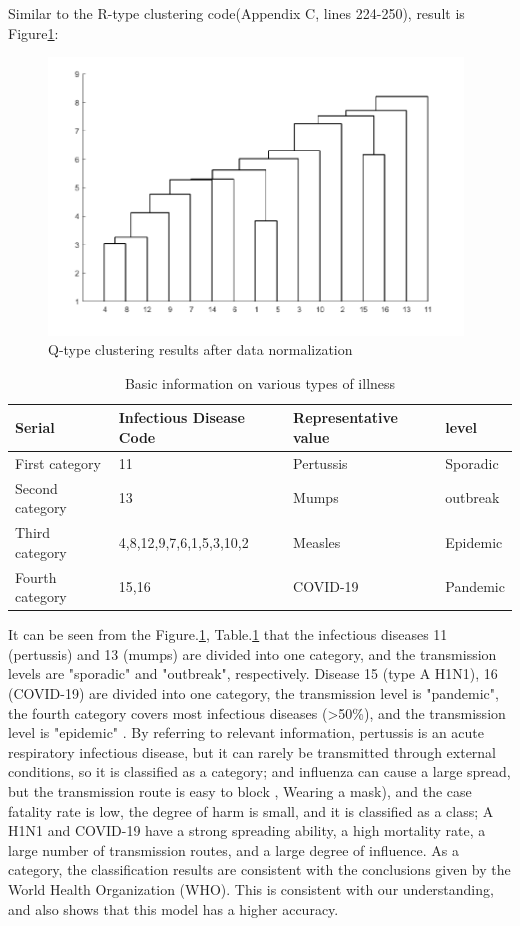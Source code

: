 \documentclass[a4paper, 11pt,twoside=true]{scrartcl}
\begin{document}
\quad Similar to the R-type clustering code(Appendix C, lines 224-250), result is Figure\ref{sp1}:
\begin{figure}[h]
	\small
	\centering
	\includegraphics[width=11cm]{sp1}
	\caption{Q-type clustering results after data normalization} \label{sp1}
\end{figure}
\begin{table}[H]
	\centering
	\caption{Basic information on various types of illness} \label{P3T4}
	\begin{tabular}{llll}
		\hline
		\textbf{Serial} & \textbf{Infectious Disease Code}          & \textbf{Representative value} & \textbf{level} \\ \hline
		First category         & 11                      & Pertussis          & Sporadic          \\
		Second category         & 13                      & Mumps          & outbreak        \\
		Third category         & 4,8,12,9,7,6,1,5,3,10,2 & Measles           & Epidemic          \\
		Fourth category         & 15,16                   & COVID-19     & Pandemic         \\ \hline
	\end{tabular}
\end{table}
\quad It can be seen from the Figure.\ref{sp1}, Table.\ref{P3T4} that the infectious diseases 11 (pertussis) and 13 (mumps) are divided into one category, and the transmission levels are "sporadic" and "outbreak", respectively. Disease 15 (type A H1N1), 16 (COVID-19) are divided into one category, the transmission level is "pandemic", the fourth category covers most infectious diseases (>50\%), and the transmission level is "epidemic" . By referring to relevant information, pertussis is an acute respiratory infectious disease, but it can rarely be transmitted through external conditions, so it is classified as a category; and influenza can cause a large spread, but the transmission route is easy to block , Wearing a mask), and the case fatality rate is low, the degree of harm is small, and it is classified as a class; A H1N1 and COVID-19 have a strong spreading ability, a high mortality rate, a large number of transmission routes, and a large degree of influence. As a category, the classification results are consistent with the conclusions given by the World Health Organization (WHO). This is consistent with our understanding, and also shows that this model has a higher accuracy.
\end{document}

